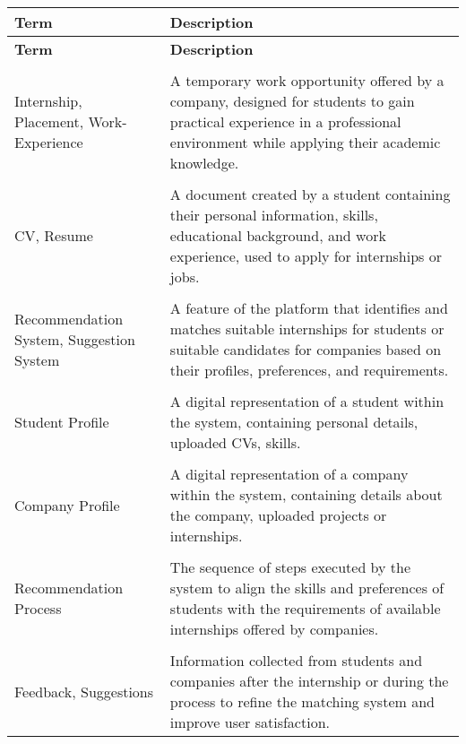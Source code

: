 \begin{longtable}{p{}p{}}
    \textbf{\large Term} & \textbf{\large Description} \\
    \hline
    \endfirsthead
    \textbf{\large Term} & \textbf{\large Description} \\
    \hline
    \endhead

    \vspace{0.5em}\\
    Internship, Placement, Work-Experience & A temporary work opportunity offered by a company, designed for students to gain practical experience in a professional environment while applying their academic knowledge. \\
    \vspace{0.5em}\\
    CV, Resume & A document created by a student containing their personal information, skills, educational background, and work experience, used to apply for internships or jobs. \\
    \vspace{0.5em}\\
    Recommendation System, Suggestion System & A feature of the platform that identifies and matches suitable internships for students or suitable candidates for companies based on their profiles, preferences, and requirements. \\
    \vspace{0.5em}\\
    Student Profile & A digital representation of a student within the system, containing personal details, uploaded CVs, skills. \\
    \vspace{0.5em}\\
    Company Profile & A digital representation of a company within the system, containing details about the company, uploaded projects or internships. \\
    \vspace{0.5em}\\
    Recommendation Process & The sequence of steps executed by the system to align the skills and preferences of students with the requirements of available internships offered by companies. \\
    \vspace{0.5em}\\
    Feedback, Suggestions & Information collected from students and companies after the internship or during the process to refine the matching system and improve user satisfaction. \\

\end{longtable}
